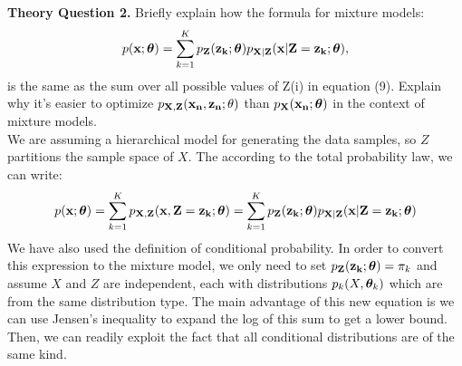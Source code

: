 \documentclass[11pt,a4paper]{article}
\begin{document}
	\color{blue}
	\large{\textbf{Theory Question 2.}} Briefly explain how the formula for mixture models:
	\begin{equation*}
	p(\vb{x}; \vb*{\theta}) =
\sum^K_{k=1}p_{\vb{Z}}(\vb{z_k}; \vb*{\theta})p_{\vb{X}|\vb{Z}}(\vb{x}|\vb{Z} = \vb{z_k}; \vb*{\theta}),
	\end{equation*}
	is the same as the sum over all possible values of Z(i) in equation (9). Explain why it’s easier
to optimize $p_{\vb{X},\vb{Z}}(\vb{x_n}, \vb{z_n}; \vb{\theta})$ than $p_{\vb{X}}(\vb{x_n}; \vb*{\theta})$ in the context of mixture models. 
	\color{black}
	\\ We are assuming a hierarchical model for generating the data samples, so $Z$ partitions the sample space of $X$. The according to the total probability law, we can write:
	\begin{equation*}
	p(\vb{x}; \vb*{\theta}) =
\sum^K_{k=1}p_{\vb{X},\vb{Z}}(\vb{x,Z=z_k}; \vb*{\theta})=\sum^K_{k=1}p_{\vb{Z}}(\vb{z_k}; \vb*{\theta})p_{\vb{X}|\vb{Z}}(\vb{x}|\vb{Z} = \vb{z_k}; \vb*{\theta})
	\end{equation*}
	We have also used the definition of conditional probability.	In order to convert this expression to the mixture model, we only need to set $p_{\vb{Z}}(\vb{z_k}; \vb*{\theta})=\pi_k$ and assume $X$ and $Z$ are independent, each with distributions $p_k(X,\vb*{\theta}_k)$ which are from the same distribution type.
	The main advantage of this new equation is we can use Jensen's inequality to expand the log of this sum to get a lower bound. Then, we can readily exploit the fact that all conditional distributions are of the same kind.\\
	
\end{document}
